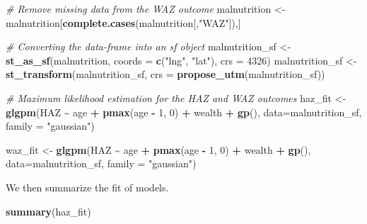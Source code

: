 \documentclass[
  letterpaper,
]{krantz}
\newenvironment{Shaded}{\begin{snugshade}}{\end{snugshade}}
\newcommand{\AttributeTok}[1]{\textcolor[rgb]{0.13,0.29,0.53}{#1}}
\newcommand{\CommentTok}[1]{\textcolor[rgb]{0.56,0.35,0.01}{\textit{#1}}}
\newcommand{\DecValTok}[1]{\textcolor[rgb]{0.00,0.00,0.81}{#1}}
\newcommand{\FunctionTok}[1]{\textcolor[rgb]{0.13,0.29,0.53}{\textbf{#1}}}
\newcommand{\NormalTok}[1]{#1}
\newcommand{\OtherTok}[1]{\textcolor[rgb]{0.56,0.35,0.01}{#1}}
\newcommand{\SpecialCharTok}[1]{\textcolor[rgb]{0.81,0.36,0.00}{\textbf{#1}}}
\newcommand{\StringTok}[1]{\textcolor[rgb]{0.31,0.60,0.02}{#1}}
\begin{document}
\begin{Shaded}
\begin{Highlighting}[]
\CommentTok{\# Remove missing data from the WAZ outcome}
\NormalTok{malnutrition }\OtherTok{\textless{}{-}}\NormalTok{ malnutrition[}\FunctionTok{complete.cases}\NormalTok{(malnutrition[,}\StringTok{"WAZ"}\NormalTok{]),]}

\CommentTok{\# Converting the data{-}frame into an sf object}
\NormalTok{malnutrition\_sf }\OtherTok{\textless{}{-}} \FunctionTok{st\_as\_sf}\NormalTok{(malnutrition, }\AttributeTok{coords =} \FunctionTok{c}\NormalTok{(}\StringTok{"lng"}\NormalTok{, }\StringTok{"lat"}\NormalTok{), }\AttributeTok{crs =} \DecValTok{4326}\NormalTok{)}
\NormalTok{malnutrition\_sf }\OtherTok{\textless{}{-}} \FunctionTok{st\_transform}\NormalTok{(malnutrition\_sf, }\AttributeTok{crs =} \FunctionTok{propose\_utm}\NormalTok{(malnutrition\_sf))}

\CommentTok{\# Maximum likelihood estimation for the HAZ and WAZ outcomes}
\NormalTok{haz\_fit }\OtherTok{\textless{}{-}} 
\FunctionTok{glgpm}\NormalTok{(HAZ }\SpecialCharTok{\textasciitilde{}}\NormalTok{ age }\SpecialCharTok{+} \FunctionTok{pmax}\NormalTok{(age }\SpecialCharTok{{-}} \DecValTok{1}\NormalTok{, }\DecValTok{0}\NormalTok{) }\SpecialCharTok{+}\NormalTok{ wealth }\SpecialCharTok{+} \FunctionTok{gp}\NormalTok{(),}
      \AttributeTok{data=}\NormalTok{malnutrition\_sf, }\AttributeTok{family =} \StringTok{"gaussian"}\NormalTok{)}

\NormalTok{waz\_fit }\OtherTok{\textless{}{-}} 
  \FunctionTok{glgpm}\NormalTok{(HAZ }\SpecialCharTok{\textasciitilde{}}\NormalTok{ age }\SpecialCharTok{+} \FunctionTok{pmax}\NormalTok{(age }\SpecialCharTok{{-}} \DecValTok{1}\NormalTok{, }\DecValTok{0}\NormalTok{) }\SpecialCharTok{+}\NormalTok{ wealth }\SpecialCharTok{+} \FunctionTok{gp}\NormalTok{(),}
        \AttributeTok{data=}\NormalTok{malnutrition\_sf, }\AttributeTok{family =} \StringTok{"gaussian"}\NormalTok{) }
\end{Highlighting}
\end{Shaded}

We then summarize the fit of models.

\begin{Shaded}
\begin{Highlighting}[]
\FunctionTok{summary}\NormalTok{(haz\_fit)}
\end{Highlighting}
\end{Shaded}
\end{document}

